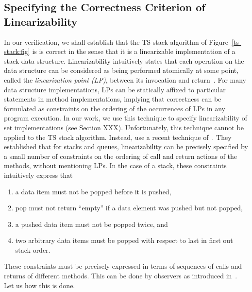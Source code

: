 \subsection{Specifying the Correctness Criterion of Linearizability}
In our verification, we shall establish that the TS stack algorithm of
Figure~\ref{ts-stack:fig} is is correct in the sense that it is a
linearizable implementation of a stack data structure.
Linearizability intuitively states that
each operation on the data structure can be considered as being
performed atomically at some point, called the {\em linearization point (LP)},
between its invocation and return~\cite{HeWi:linearizability}.
For many data structure implementations, LPs can be statically
affixed to particular statements in method implementations,
implying that correctness can be formulated as constraints on the ordering of the
occurrences of LPs in any program execution.
In our work, we use this technique to specify linearizability of
set implementations (see Section XXX).
Unfortunately, this technique cannot be applied to the TS stack algorithm.
Instead, use a recent technique of~\cite{BEEH:icalp15}. They
established that for stacks and queues,
linearizability can be precisely specified by a small number of
constraints on the ordering of call and return actions of the methods,
without mentioning LPs.
In the case of a stack, these constraints intuitively express that
\begin{enumerate}
\item a data item must not be popped before it is pushed,
\item pop must not return ``empty'' if a data element was pushed but not
  popped,
\item a pushed data item must not be popped twice, and
\item two arbitrary data items must be popped with respect to last in first out stack order.%
\end{enumerate}
These constraints must be precisely expressed in terms of sequences of calls
and returns of different methods. This can be done by
observers as introduced in~\cite{AHHR:integrated}. 
Let us how this is done.

